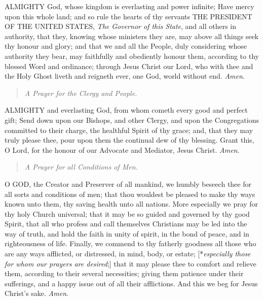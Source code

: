 ALMIGHTY
God, whose kingdom is everlasting and power infinite; Have mercy upon
this whole land; and so rule the hearts of thy servants THE
PRESIDENT OF THE UNITED
STATES, \emph{The Governor of this State}, and
all others in authority, that they, knowing whose ministers they are,
may above all things seek thy honour and glory; and that we and all the
People, duly considering whose authority they bear, may faithfully and
obediently honour them, according to thy blessed Word and ordinance; through
Jesus Christ our Lord, who with thee and the Holy Ghost liveth and reigneth
ever, one God, world without end. \emph{Amen}.

\begin{quote}

\emph{A
Prayer for the Clergy and People.}

\end{quote}

ALMIGHTY
and everlasting God, from whom cometh every good and perfect gift; Send
down upon our Bishops, and other Clergy, and upon the Congregations committed
to their charge, the healthful Spirit of thy grace; and, that they may
truly please thee, pour upon them the continual dew of thy blessing. Grant
this, O Lord, for the honour of our Advocate and Mediator, Jesus Christ.
\emph{Amen}.

\begin{quote}

\emph{A
Prayer for all Conditions of Men.}

\end{quote}

O
GOD, the Creator and Preserver of all mankind, we humbly beseech thee
for all sorts and conditions of men; that thou wouldest be pleased to
make thy ways known unto them, thy saving health unto all nations. More
especially we pray for thy holy Church universal; that it may be so guided
and governed by thy good Spirit, that all who profess and call themselves
Christians may be led into the way of truth, and hold the faith in unity
of spirit, in the bond of peace, and in righteousness of life. Finally,
we commend to thy fatherly goodness all those who are any ways afflicted,
or distressed, in mind, body, or estate; [*\emph{especially those
for whom our prayers are desired};] that it may please thee to comfort
and relieve them, according to their several necessities; giving them
patience under their sufferings, and a happy issue out of all their afflictions.
And this we beg for Jesus Christ’s sake. \emph{Amen}.

